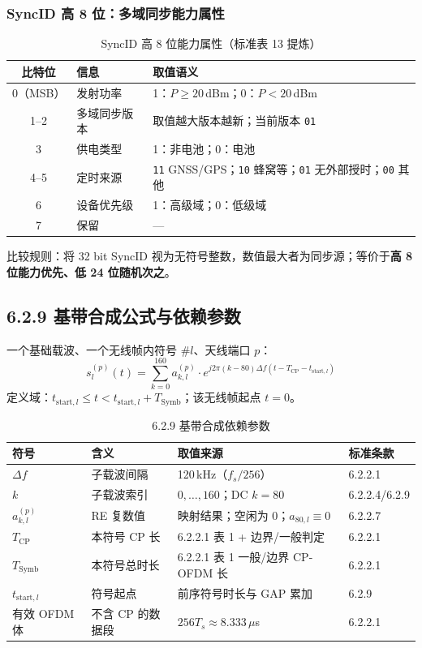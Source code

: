 \documentclass[11pt,a4paper]{ctexart}
\begin{document}
\subsubsection{SyncID 高 8 位：多域同步能力属性}

\begin{longtable}{clL{9cm}}
\caption{SyncID 高 8 位能力属性（标准表 13 提炼）\label{tab:628-cap}} \\
\toprule
\textbf{比特位} & \textbf{信息} & \textbf{取值语义} \\
（MSB） & 发射功率 & 1：$P\ge 20$\,dBm；0：$P<20$\,dBm \\
1--2 & 多域同步版本 & 取值越大版本越新；当前版本 \texttt{01} \\
3 & 供电类型 & 1：非电池；0：电池 \\
4--5 & 定时来源 & \texttt{11} GNSS/GPS；\texttt{10} 蜂窝等；\texttt{01} 无外部授时；\texttt{00} 其他 \\
6 & 设备优先级 & 1：高级域；0：低级域 \\
7 & 保留 & --- \\
\bottomrule
\end{longtable}

比较规则：将 32 bit SyncID 视为无符号整数，数值最大者为同步源；等价于\textbf{高 8 位能力优先、低 24 位随机次之}。

\subsection{6.2.9 基带合成公式与依赖参数}

一个基础载波、一个无线帧内符号 \#$l$、天线端口 $p$：
\begin{equation}
s_l^{(p)}(t)=\sum_{k=0}^{160}a_{k,l}^{(p)}\cdot
e^{j2\pi(k-80)\Delta f\left(t-T_{\mathrm{CP}}-t_{\mathrm{start},l}\right)}
\label{eq:629}
\end{equation}
定义域：$t_{\mathrm{start},l}\le t < t_{\mathrm{start},l}+T_{\mathrm{Symb}}$；该无线帧起点 $t{=}0$。

\begin{longtable}{L{2.8cm}L{4.5cm}L{4.5cm}L{2cm}}
\caption{6.2.9 基带合成依赖参数\label{tab:629-param}} \\
\toprule
\textbf{符号} & \textbf{含义} & \textbf{取值来源} & \textbf{标准条款} \\
\midrule
$\Delta f$ & 子载波间隔 & 120\,kHz（$f_s/256$） & 6.2.2.1 \\
$k$ & 子载波索引 & $0,\ldots,160$；DC $k{=}80$ & 6.2.2.4/6.2.9 \\
$a_{k,l}^{(p)}$ & RE 复数值 & 映射结果；空闲为 0；$a_{80,l}{\equiv}0$ & 6.2.2.7 \\
$T_{\mathrm{CP}}$ & 本符号 CP 长 & 6.2.2.1 表 1 + 边界/一般判定 & 6.2.2.1 \\
$T_{\mathrm{Symb}}$ & 本符号总时长 & 6.2.2.1 表 1 一般/边界 CP-OFDM 长 & 6.2.2.1 \\
$t_{\mathrm{start},l}$ & 符号起点 & 前序符号时长与 GAP 累加 & 6.2.9 \\
有效 OFDM 体 & 不含 CP 的数据段 & $256T_s\approx 8.333$\,$\mu$s & 6.2.2.1 \\
\bottomrule
\end{longtable}
\end{document}
